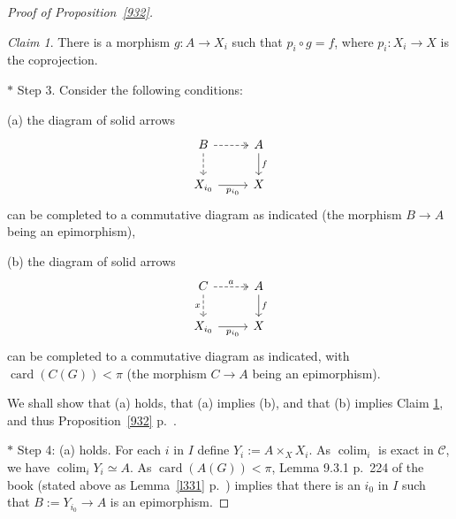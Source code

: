 \documentclass[12pt]{article}
\theoremstyle{remark}
\newtheorem{claim}[thm]{Claim}
\theoremstyle{definition}
\newcommand{\nn}{\noindent}
\newcommand{\C}{\mathcal C}
\DeclareMathOperator*{\colim}{colim}
\DeclareMathOperator{\card}{card}
\begin{document}
\begin{proof}[Proof of Proposition~\ref{932}]
\begin{claim}\label{pig=f} 
There is a morphism $g:A\to X_i$ such that $p_i\circ g=f$, where $p_i:X_i\to X$ is the coprojection.
\end{claim} 

\nn$*$ Step 3. Consider the following conditions: 

\nn(a) the diagram of solid arrows 
$$
\begin{tikzcd}
B\ar[dashed,two heads]{r}\ar[dashed]{d}&A\ar{d}{f}\\ 
X_{i_0}\ar{r}[swap]{p_{i_0}}&X
\end{tikzcd}
$$
can be completed to a commutative diagram as indicated (the morphism $B\to A$ being an epimorphism),

\nn(b) the diagram of solid arrows 
%
\begin{equation}\label{fa}
\begin{tikzcd}
C\ar[dashed,two heads]{r}{a}\ar[dashed]{d}[swap]{x}&A\ar{d}{f}\\ 
X_{i_0}\ar{r}[swap]{p_{i_0}}&X
\end{tikzcd}
\end{equation}
%
can be completed to a commutative diagram as indicated, with $\card(C(G))<\pi$ (the morphism $C\to A$ being an epimorphism).

We shall show that (a) holds, that (a) implies (b), and that (b) implies Claim \ref{pig=f}, and thus Proposition~\ref{932} p.~\pageref{932}. 

\nn$*$ Step 4: (a) holds. For each $i$ in $I$ define $Y_i:=A\times_XX_i$. As $\colim_i$ is exact in $\C$, we have $\colim_iY_i\simeq A$. As $\card(A(G))<\pi$, Lemma 9.3.1 p.~224 of the book (stated above as Lemma~\ref{l331} p.~\pageref{l331}) implies that there is an $i_0$ in $I$ such that $B:=Y_{i_0}\to A$ is an epimorphism.


\end{proof}
\end{document}
